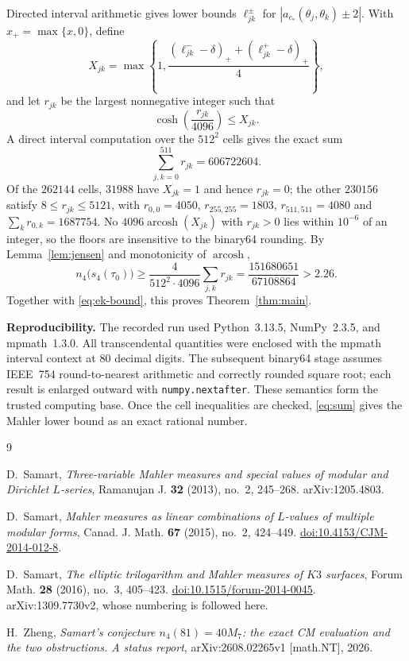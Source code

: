 \documentclass[11pt]{amsart}
\DeclareMathOperator{\arcosh}{arcosh}
\begin{document}
Directed interval arithmetic gives lower bounds $\ell_{jk}^{\pm}$ for
$|a_{c_*}(\theta_j,\theta_k)\pm2|$. With $x_+=\max\{x,0\}$, define
\[
 X_{jk}=\max\left\{1,
 \frac{(\ell_{jk}^{-}-\delta)_+
       +(\ell_{jk}^{+}-\delta)_+}{4}\right\},
\]
and let $r_{jk}$ be the largest nonnegative integer such that
\[
 \cosh\left(\frac{r_{jk}}{4096}\right)\le X_{jk}.
\]
A direct interval computation over the $512^2$ cells gives the exact
sum
\begin{equation}\label{eq:sum}
 \sum_{j,k=0}^{511}r_{jk}=606722604.
\end{equation}
Of the $262144$ cells, $31988$ have $X_{jk}=1$ and hence $r_{jk}=0$;
the other $230156$ satisfy $8\le r_{jk}\le5121$, with $r_{0,0}=4050$,
$r_{255,255}=1803$, $r_{511,511}=4080$ and $\sum_kr_{0,k}=1687754$. No
$4096\arcosh(X_{jk})$ with $r_{jk}>0$ lies within $10^{-6}$ of an
integer, so the floors are insensitive to the binary64 rounding.
By Lemma~\ref{lem:jensen} and monotonicity of $\arcosh$,
\[
 n_4\bigl(s_4(\tau_0)\bigr)
 \ge \frac{4}{512^2\cdot4096}\sum_{j,k}r_{jk}
 =\frac{151680651}{67108864}>2.26.
\]
Together with \eqref{eq:ek-bound}, this proves
Theorem~\ref{thm:main}.

\medskip
\noindent
\textbf{Reproducibility.}
The recorded run used Python~3.13.5, NumPy~2.3.5, and mpmath~1.3.0.
All transcendental quantities were enclosed with the mpmath interval
context at $80$ decimal digits. The subsequent binary64 stage assumes
IEEE~754 round-to-nearest arithmetic and correctly rounded square root;
each result is enlarged outward with \texttt{numpy.nextafter}. These
semantics form the trusted computing base. Once the cell inequalities
are checked, \eqref{eq:sum} gives the Mahler lower bound as an exact
rational number.

\begin{thebibliography}{9}

D.~Samart,
\emph{Three-variable Mahler measures and special values of modular and
Dirichlet $L$-series},
Ramanujan J. \textbf{32} (2013), no.~2, 245--268.
arXiv:1205.4803.

D.~Samart,
\emph{Mahler measures as linear combinations of $L$-values of multiple
modular forms},
Canad. J. Math. \textbf{67} (2015), no.~2, 424--449.
\href{https://doi.org/10.4153/CJM-2014-012-8}
{doi:10.4153/CJM-2014-012-8}.

D.~Samart,
\emph{The elliptic trilogarithm and Mahler measures of $K3$ surfaces},
Forum Math. \textbf{28} (2016), no.~3, 405--423.
\href{https://doi.org/10.1515/forum-2014-0045}
{doi:10.1515/forum-2014-0045}.
arXiv:1309.7730v2, whose numbering is followed here.

H.~Zheng,
\emph{Samart's conjecture $n_4(81)=40M_7$: the exact CM evaluation and
the two obstructions. A status report},
arXiv:2608.02265v1 [math.NT], 2026.

\end{thebibliography}
\end{document}
